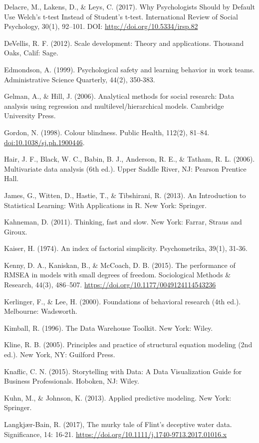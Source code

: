 \documentclass[
]{book}
\begin{document}
Delacre, M., Lakens, D., \& Leys, C. (2017). Why Psychologists Should by Default Use Welch's t-test Instead of Student's t-test. International Review of Social Psychology, 30(1), 92--101. DOI: \url{http://doi.org/10.5334/irsp.82}

DeVellis, R. F. (2012). Scale development: Theory and applications. Thousand Oaks, Calif: Sage.

Edmondson, A. (1999). Psychological safety and learning behavior in work teams. Administrative Science Quarterly, 44(2), 350-383.

Gelman, A., \& Hill, J. (2006). Analytical methods for social research: Data analysis using regression and multilevel/hierarchical models. Cambridge University Press.

Gordon, N. (1998). Colour blindness. Public Health, 112(2), 81--84. \url{doi:10.1038/sj.ph.1900446}.

Hair, J. F., Black, W. C., Babin, B. J., Anderson, R. E., \& Tatham, R. L. (2006). Multivariate data analysis (6th ed.). Upper Saddle River, NJ: Pearson Prentice Hall.

James, G., Witten, D., Hastie, T., \& Tibshirani, R. (2013). An Introduction to Statistical Learning: With Applications in R. New York: Springer.

Kahneman, D. (2011). Thinking, fast and slow. New York: Farrar, Straus and Giroux.

Kaiser, H. (1974). An index of factorial simplicity. Psychometrika, 39(1), 31-36.

Kenny, D. A., Kaniskan, B., \& McCoach, D. B. (2015). The performance of RMSEA in models with small degrees of freedom. Sociological Methods \& Research, 44(3), 486--507. \url{https://doi.org/10.1177/0049124114543236}

Kerlinger, F., \& Lee, H. (2000). Foundations of behavioral research (4th ed.). Melbourne: Wadsworth.

Kimball, R. (1996). The Data Warehouse Toolkit. New York: Wiley.

Kline, R. B. (2005). Principles and practice of structural equation modeling (2nd ed.). New York, NY: Guilford Press.

Knaflic, C. N. (2015). Storytelling with Data: A Data Visualization Guide for Business Professionals. Hoboken, NJ: Wiley.

Kuhn, M., \& Johnson, K. (2013). Applied predictive modeling. New York: Springer.

Langkjær-Bain, R. (2017), The murky tale of Flint's deceptive water data. Significance, 14: 16-21. \url{https://doi.org/10.1111/j.1740-9713.2017.01016.x}
\end{document}
